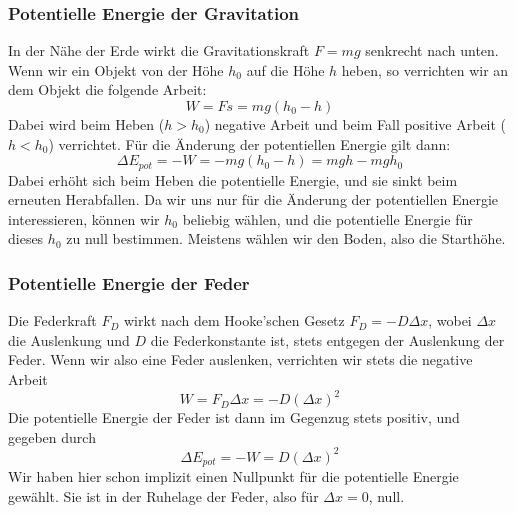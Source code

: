 \documentclass[11pt]{article}
\begin{document}
\subsubsection{Potentielle Energie der Gravitation}
In der Nähe der Erde wirkt die Gravitationskraft $F = mg$ senkrecht nach unten. Wenn wir ein Objekt von der Höhe $h_0$ auf die Höhe $h$ heben, so verrichten wir an dem Objekt die folgende Arbeit: 
\begin{equation*}
    W = Fs = mg(h_0 - h)
\end{equation*} 
Dabei wird beim Heben ($h > h_0$) negative Arbeit und beim Fall positive Arbeit ($h < h_0$) verrichtet. Für die Änderung der potentiellen Energie gilt dann: 
\begin{equation*}
    \Delta E_{pot} = -W = -mg(h_0 - h) = mgh - mgh_0
\end{equation*}
Dabei erhöht sich beim Heben die potentielle Energie, und sie sinkt beim erneuten Herabfallen. Da wir uns nur für die Änderung der potentiellen Energie interessieren, können wir $h_0$ beliebig wählen, und die potentielle Energie für dieses $h_0$ zu null bestimmen. Meistens wählen wir den Boden, also die Starthöhe. 

\subsubsection{Potentielle Energie der Feder}
Die Federkraft $F_D$ wirkt nach dem Hooke'schen Gesetz $F_D = -D \Delta x$, wobei $\Delta x$ die Auslenkung und $D$ die Federkonstante ist, stets entgegen der Auslenkung der Feder. Wenn wir also eine Feder auslenken, verrichten wir stets die negative Arbeit 
\begin{equation*}
    W = F_D\Delta x = - D (\Delta x) ^2
\end{equation*}
Die potentielle Energie der Feder ist dann im Gegenzug stets positiv, und gegeben durch 
\begin{equation*}
    \Delta E_{pot} = -W = D (\Delta x) ^2
\end{equation*}
Wir haben hier schon implizit einen Nullpunkt für die potentielle Energie gewählt. Sie ist in der Ruhelage der Feder, also für $\Delta x = 0$, null. 
\end{document}

